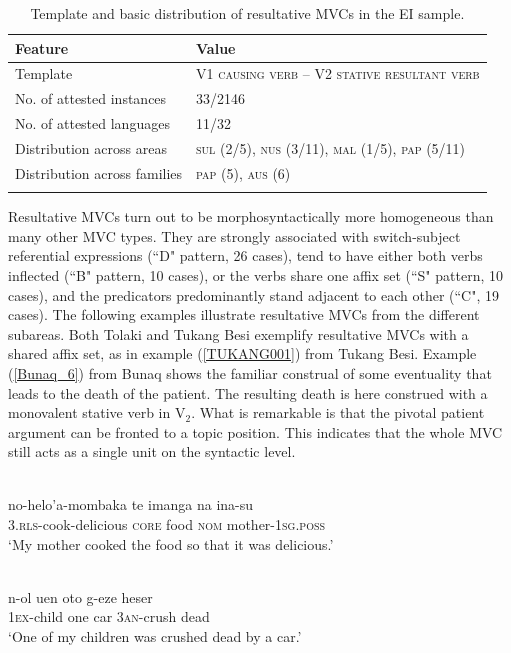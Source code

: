 \begin{table}
\begin{tabular}{ll}
\lsptoprule
Feature&Value\tabularnewline
\midrule
Template&V1 \textsc{causing verb} -- V2 \textsc{stative resultant verb}\tabularnewline
No. of attested instances& 33/2146 \tabularnewline
No. of attested languages& 11/32 \tabularnewline
Distribution across areas& \textsc{sul} (2/5), \textsc{nus} (3/11), \textsc{mal} (1/5), \textsc{pap} (5/11) \tabularnewline
Distribution across families& \textsc{pap} (5), \textsc{aus} (6) \tabularnewline
\lspbottomrule
\end{tabular}
\caption[Template and basic distribution of resultative MVCs]{Template and basic distribution of resultative MVCs in the EI sample. }
\label{table:resultative}
\end{table}

Resultative MVCs turn out to be morphosyntactically more homogeneous than many other MVC types. They are strongly associated with switch-subject referential expressions (``D" pattern, 26 cases), tend to have either both verbs inflected (``B" pattern, 10 cases), or the verbs share one affix set (``S" pattern, 10 cases), and the predicators predominantly stand adjacent to each other (``C", 19 cases). The following examples illustrate resultative MVCs from the different subareas. Both Tolaki and Tukang Besi exemplify resultative MVCs with a shared affix set, as in example (\ref{TUKANG001}) from Tukang Besi. Example (\ref{Bunaq_6}) from Bunaq shows the familiar construal of some eventuality that leads to the death of the patient. The resulting death is here construed with a monovalent stative verb in V$_2$. What is remarkable is that the pivotal patient argument can be fronted to a topic position. This indicates that the whole MVC still acts as a single unit on the syntactic level. 

\ea \label{TUKANG001}
\\
\gll no-helo'a-mombaka te imanga na ina-su \\
\textsc{3}.\textsc{rls}-cook-delicious \textsc{core} food \textsc{nom} mother-\textsc{1}\textsc{sg}.\textsc{poss} \\
\glft `My mother cooked the food so that it was delicious.'\\ 
\z

\ea \label{Bunaq_6}
\\
\gll n-ol uen oto g-eze heser \\
1\textsc{ex}-child one car 3\textsc{an}-crush dead \\
\glft `One of my children was crushed dead by a car.’\\ 
\z

